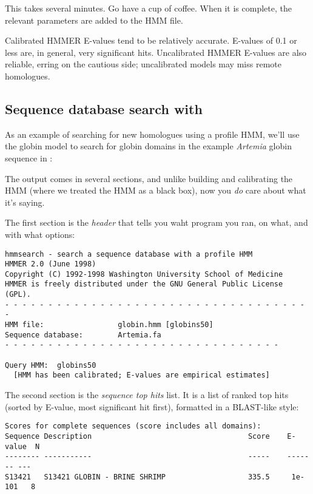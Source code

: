 This takes several minutes. Go have a cup of coffee. When it is
complete, the relevant parameters are added to the HMM file.

Calibrated HMMER E-values tend to be relatively accurate. E-values of
0.1 or less are, in general, very significant hits. Uncalibrated HMMER
E-values are also reliable, erring on the cautious side; uncalibrated
models may miss remote homologues.

\subsection{Sequence database search with }

As an example of searching for new homologues using a profile HMM,
we'll use the globin model to search for globin domains in the example
{\em Artemia} globin sequence in :

\vspace{1.5em}

The output comes in several sections, and unlike building and
calibrating the HMM (where we treated the HMM as a black box), now you
{\em do} care about what it's saying.

The first section is the {\em header} that tells you waht program you
ran, on what, and with what options:

{\small\begin{verbatim}
hmmsearch - search a sequence database with a profile HMM
HMMER 2.0 (June 1998)
Copyright (C) 1992-1998 Washington University School of Medicine
HMMER is freely distributed under the GNU General Public License (GPL).
- - - - - - - - - - - - - - - - - - - - - - - - - - - - - - - - - - - -
HMM file:                 globin.hmm [globins50]
Sequence database:        Artemia.fa
- - - - - - - - - - - - - - - - - - - - - - - - - - - - - - - -

Query HMM:  globins50  
  [HMM has been calibrated; E-values are empirical estimates]
\end{verbatim}}

The second section is the {\em sequence top hits} list. It is a list
of ranked top hits (sorted by E-value, most significant hit first),
formatted in a BLAST-like style:

{\small\begin{verbatim}
Scores for complete sequences (score includes all domains):
Sequence Description                                    Score    E-value  N 
-------- -----------                                    -----    ------- ---
S13421   S13421 GLOBIN - BRINE SHRIMP                   335.5     1e-101   8
\end{verbatim}}

